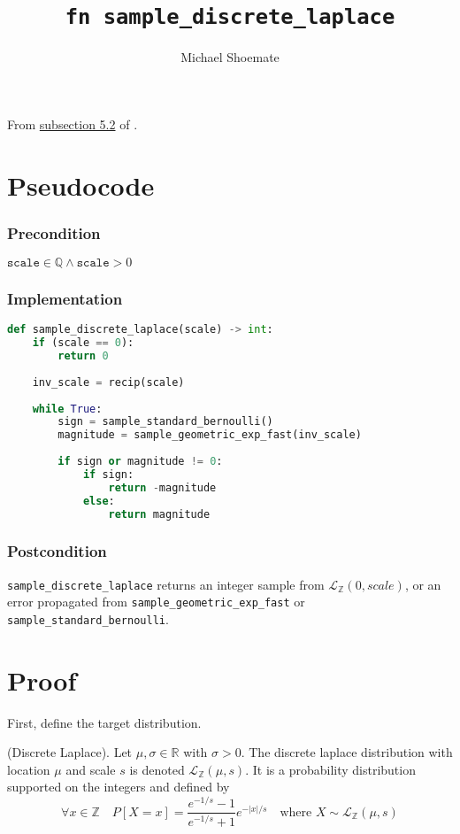 \documentclass{article}
\title{\texttt{fn sample\_discrete\_laplace}}
\author{Michael Shoemate}
\begin{document}
\maketitle

From \href{https://arxiv.org/pdf/2004.00010.pdf#subsection.5.2}{subsection 5.2} of \cite{CKS20}.

\section{Pseudocode}
\subsubsection*{Precondition}
$\texttt{scale} \in \mathbb{Q} \land \texttt{scale} > 0$

\subsubsection*{Implementation}        
\begin{lstlisting}[language=Python]
def sample_discrete_laplace(scale) -> int:
    if (scale == 0):
        return 0
        
    inv_scale = recip(scale)
    
    while True:
        sign = sample_standard_bernoulli()
        magnitude = sample_geometric_exp_fast(inv_scale)
        
        if sign or magnitude != 0:
            if sign:
                return -magnitude
            else:
                return magnitude
\end{lstlisting}

\subsubsection*{Postcondition}
\texttt{sample\_discrete\_laplace} returns an integer sample from $\mathcal{L}_\mathbb{Z}(0, scale)$, or an error propagated from \texttt{sample\_geometric\_exp\_fast} or \texttt{sample\_standard\_bernoulli}.

\section{Proof}

First, define the target distribution.

\begin{definition}
    (Discrete Laplace). Let $\mu, \sigma \in \mathbb{R}$ with $\sigma > 0$. The discrete laplace distribution with location $\mu$ and scale $s$ is denoted $\mathcal{L}_\mathbb{Z}(\mu, s)$. It is a probability distribution supported on the integers and defined by \cite{BV17}
\begin{equation*}
    \forall x \in \mathbb{Z} \quad  P[X = x] = \frac{e^{-1/s} - 1}{e^{-1/s} + 1} e^{-|x|/s} \quad \text{where } X \sim \mathcal{L}_\mathbb{Z}(\mu, s)
\end{equation*}
\end{definition}
\end{document}

